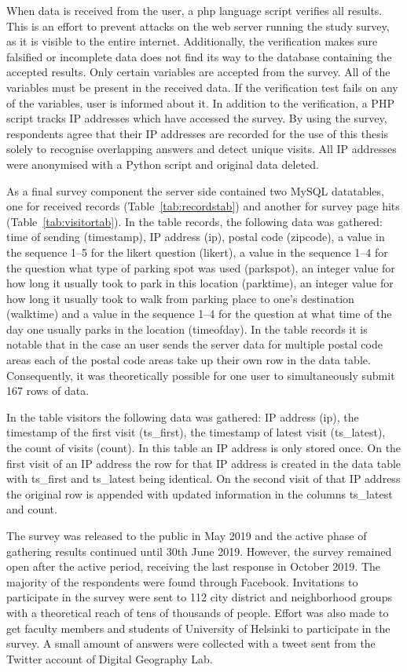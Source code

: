 When data is received from the user, a \gls{php} language script verifies all results. This is an effort to prevent attacks on the web server running the study survey, as it is visible to the entire internet. Additionally, the verification makes sure falsified or incomplete data does not find its way to the database containing the accepted results. Only certain variables are accepted from the survey. All of the variables must be present in the received data. If the verification test fails on any of the variables, user is informed about it. In addition to the verification, a PHP script tracks IP addresses which have accessed the survey. By using the survey, respondents agree that their IP addresses are recorded for the use of this thesis solely to recognise overlapping answers and detect unique visits. All IP addresses were anonymised with a Python script and original data deleted.

As a final survey component the server side contained two MySQL datatables, one for received records (Table~\ref{tab:recordstab}) and another for survey page hits (Table~\ref{tab:visitortab}). In the table records, the following data was gathered: time of sending (timestamp), IP address (ip), postal code (zipcode), a value in the sequence 1--5 for the likert question (likert), a value in the sequence 1--4 for the question what type of parking spot was used (parkspot), an integer value for how long it usually took to park in this location (parktime), an integer value for how long it usually took to walk from parking place to one's destination (walktime) and a value in the sequence 1--4 for the question at what time of the day one usually parks in the location (timeofday). In the table records it is notable that in the case an user sends the server data for multiple postal code areas each of the postal code areas take up their own row in the data table. Consequently, it was theoretically possible for one user to simultaneously submit 167 rows of data.

In the table visitors the following data was gathered: IP address (ip), the timestamp of the first visit (ts\_first), the timestamp of latest visit (ts\_latest), the count of visits (count). In this table an IP address is only stored once. On the first visit of an IP address the row for that IP address is created in the data table with ts\_first and ts\_latest being identical. On the second visit of that IP address the original row is appended with updated information in the columns ts\_latest and count.

The survey was released to the public in May 2019 and the active phase of gathering results continued until 30th June 2019. However, the survey remained open after the active period, receiving the last response in October 2019. The majority of the respondents were found through Facebook. Invitations to participate in the survey were sent to 112 city district and neighborhood groups with a theoretical reach of tens of thousands of people. Effort was also made to get faculty members and students of University of Helsinki to participate in the survey. A small amount of answers were collected with a tweet sent from the Twitter account of Digital Geography Lab. 

